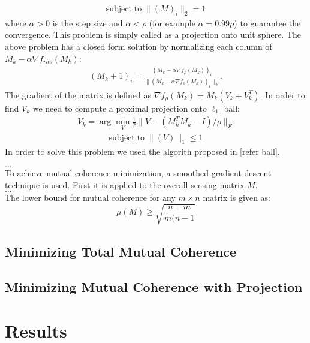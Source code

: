 \documentclass[journal]{IEEEtran}
\begin{document}
\begin{align}
\textrm{subject}\;\textrm{to} \;\|(M)_i\|_2=1
\end{align}
where $\alpha>0$ is the step size and $\alpha<\rho$ (for example $\alpha=0.99\rho$) to guarantee the convergence. This problem is simply called as a projection onto unit sphere. The above problem has a closed form solution by normalizing each column of $M_k-\alpha \nabla f_{rho} (M_k)$:
\begin{align}
(M_k+1)_i=\frac{(M_k-\alpha \nabla f_{\rho} (M_k))_i}{\|(M_k-\alpha \nabla f_{\rho} (M_k))_i\|_2}.
\end{align}
The gradient of the matrix is defined as $ \nabla f_{\rho} (M_k)=M_k(V_k+V_k^T)$. In order to find $V_k$ we need to compute a proximal projection onto $\ell_1$ ball:
\begin{align}
V_k=\arg\min_{V}\frac{1}{2}\| V-(M_k^TM_k-I)/\rho  \|_F
\end{align}
\begin{align}
\textrm{subject}\;\textrm{to} \;\|(V)\|_1\leq1
\end{align}
In order to solve this problem we used the algorith proposed in [refer ball].

$\hdots$\\
To achieve mutual coherence minimization, a smoothed gradient descent technique is used.
First it is applied to the overall sensing matrix $M$. \\
$\hdots$\\
The lower bound for mutual coherence for any $m\times n$ matrix is given as:
\begin{equation}
\mu(M) \geq \sqrt{\frac{n - m}{m(n-1}}
\end{equation}
\subsection{Minimizing Total Mutual Coherence}

\subsection{Minimizing Mutual Coherence with Projection}


\section{Results}
\end{document}
